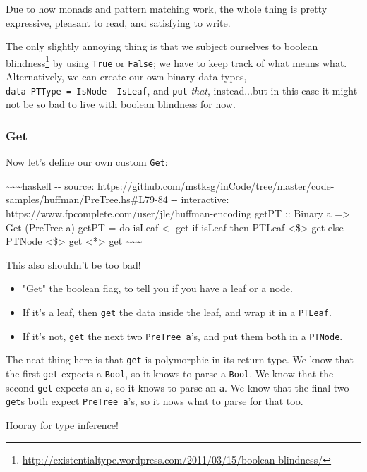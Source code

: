 \documentclass[]{article}
\renewcommand{\href}[2]{#2\footnote{\url{#1}}}
\begin{document}
Due to how monads and pattern matching work, the whole thing is pretty
expressive, pleasant to read, and satisfying to write.

The only slightly annoying thing is that we subject ourselves to
\href{http://existentialtype.wordpress.com/2011/03/15/boolean-blindness/}{boolean
blindness} by using \texttt{True} or \texttt{False}; we have to keep track of
what means what. Alternatively, we can create our own binary data types,
\texttt{data\ PTType\ =\ IsNode\ \textbar{}\ IsLeaf}, and \texttt{put}
\emph{that}, instead...but in this case it might not be so bad to live with
boolean blindness for now.

\subsubsection{Get}

Now let's define our own custom \texttt{Get}:

\textasciitilde{}\textasciitilde{}\textasciitilde{}haskell -\/- source:
https://github.com/mstksg/inCode/tree/master/code-samples/huffman/PreTree.hs\#L79-84
-\/- interactive: https://www.fpcomplete.com/user/jle/huffman-encoding getPT ::
Binary a =\textgreater{} Get (PreTree a) getPT = do isLeaf \textless{}- get if
isLeaf then PTLeaf \textless{}\$\textgreater{} get else PTNode
\textless{}\$\textgreater{} get \textless{}*\textgreater{} get
\textasciitilde{}\textasciitilde{}\textasciitilde{}

This also shouldn't be too bad!

\begin{itemize}
\tightlist
\item
  "Get" the boolean flag, to tell you if you have a leaf or a node.
\item
  If it's a leaf, then \texttt{get} the data inside the leaf, and wrap it in a
  \texttt{PTLeaf}.
\item
  If it's not, \texttt{get} the next two \texttt{PreTree\ a}'s, and put them
  both in a \texttt{PTNode}.
\end{itemize}

The neat thing here is that \texttt{get} is polymorphic in its return type. We
know that the first \texttt{get} expects a \texttt{Bool}, so it knows to parse a
\texttt{Bool}. We know that the second \texttt{get} expects an \texttt{a}, so it
knows to parse an \texttt{a}. We know that the final two \texttt{get}s both
expect \texttt{PreTree\ a}'s, so it nows what to parse for that too.

Hooray for type inference!
\end{document}
